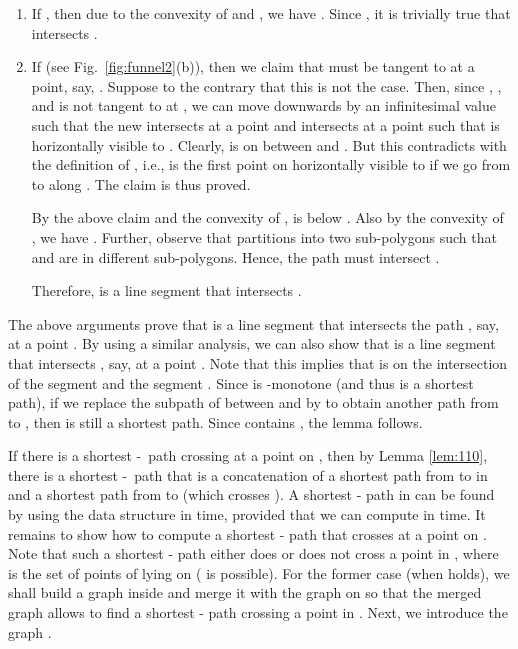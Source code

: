 \documentclass[english,runningheads,11pt]{llncs}
\def\st{-}
\newenvironment{proof}{\noindent {\textbf{Proof:}}\rm}{\hfill \rm}
\begin{document}
\begin{proof}
\begin{enumerate}
\begin{enumerate}
\item
If , then due to the convexity of  and , we have . Since , it is trivially true that  intersects .

\item
If  (see Fig.~\ref{fig:funnel2}(b)), then we claim that  must be tangent to  at a point, say, . Suppose to the contrary that this is not
the case. Then, since , , and  is not tangent to  at , we can move  downwards by an infinitesimal value such that the new  intersects
 at a point  and intersects  at a point  such that  is horizontally visible to . Clearly,  is on  between  and .
But this contradicts with the definition of , i.e.,  is the first point on  horizontally visible to  if we go from  to  along . The claim is thus proved.

By the above claim and the convexity of ,  is below . Also by the
convexity of , we have . Further, observe that  partitions  into two sub-polygons such that  and  are in different sub-polygons. Hence, the path  must intersect .

Therefore,  is a line segment that intersects .
\end{enumerate}
\end{enumerate}

The above arguments prove that  is a line segment that intersects the path , say, at a point . By using a
similar analysis, we can also show that  is a line segment that intersects , say, at a point . Note that this implies that  is on the intersection of the segment  and the segment .
Since  is -monotone (and thus is a shortest path),
if we replace the subpath of  between  and 
by  to obtain another path
 from  to , then  is still a shortest path. Since  contains , the lemma follows.
\end{proof}

If there is a shortest \st\ path crossing  at a point on ,
then by Lemma \ref{lem:110}, there is a shortest \st\ path that is a
concatenation of a shortest path from  to  in  and a
shortest path from  to  (which crosses ). A shortest - path in
 can be found by using the data structure  in  time,
provided that we can compute  in 
time. It remains to show how to compute a shortest - path that
crosses  at a point on . Note that
such a shortest - path either does or does not cross a point in
, where  is the set of
points of  lying on 
( is possible).
For the former case (when  holds), we shall
build a graph  inside  and merge it with the graph  on  so that
the merged graph allows to find a shortest - path crossing a point in
. Next, we introduce the graph .
\end{document}
